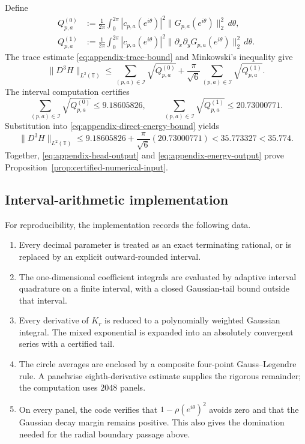 Define
\begin{align*}
  Q^{(0)}_{p,a}
  &:=\frac{1}{2\pi}\int_0^{2\pi}
  |c_{p,a}(e^{i\theta})|^2
  \|G_{p,a}(e^{i\theta})\|_2^2\,d\theta,\\
  Q^{(1)}_{p,a}
  &:=\frac{1}{2\pi}\int_0^{2\pi}
  |c_{p,a}(e^{i\theta})|^2
  \|\partial_x\partial_yG_{p,a}(e^{i\theta})\|_2^2\,d\theta.
\end{align*}
The trace estimate \eqref{eq:appendix-trace-bound} and Minkowski's inequality
give
\begin{equation}
  \|D^3H\|_{L^2(\mathbb T)}
  \le
  \sum_{(p,a)\in\mathcal I}\sqrt{Q^{(0)}_{p,a}}
  +\frac{\pi}{\sqrt6}
  \sum_{(p,a)\in\mathcal I}\sqrt{Q^{(1)}_{p,a}}.
  \label{eq:appendix-direct-energy-bound}
\end{equation}
The interval computation certifies
\[
  \sum_{(p,a)\in\mathcal I}\sqrt{Q^{(0)}_{p,a}}
  \le9.18605826,
  \qquad
  \sum_{(p,a)\in\mathcal I}\sqrt{Q^{(1)}_{p,a}}
  \le20.73000771.
\]
Substitution into \eqref{eq:appendix-direct-energy-bound} yields
\begin{equation}
  \|D^3H\|_{L^2(\mathbb T)}
  \le9.18605826+\frac{\pi}{\sqrt6}(20.73000771)
  <35.773327<35.774.
  \label{eq:appendix-energy-output}
\end{equation}
Together, \eqref{eq:appendix-head-output} and
\eqref{eq:appendix-energy-output} prove
Proposition~\ref{prop:certified-numerical-input}.

\subsection{Interval-arithmetic implementation}
\label{app:certification-implementation}

For reproducibility, the implementation records the following data.

\begin{enumerate}
  \item Every decimal parameter is treated as an exact terminating rational,
  or is replaced by an explicit outward-rounded interval.
  \item The one-dimensional coefficient integrals are evaluated by adaptive
  interval quadrature on a finite interval, with a closed Gaussian-tail bound
  outside that interval.
  \item Every derivative of $K_r$ is reduced to a polynomially weighted
  Gaussian integral.  The mixed exponential is expanded into an absolutely
  convergent series with a certified tail.
  \item The circle averages are enclosed by a composite four-point
  Gauss--Legendre rule.  A panelwise eighth-derivative estimate supplies the
  rigorous remainder; the computation uses $2048$ panels.
  \item On every panel, the code verifies that $1-\rho(e^{i\theta})^2$ avoids
  zero and that the Gaussian decay margin remains positive.  This also gives
  the domination needed for the radial boundary passage above.
\end{enumerate}

